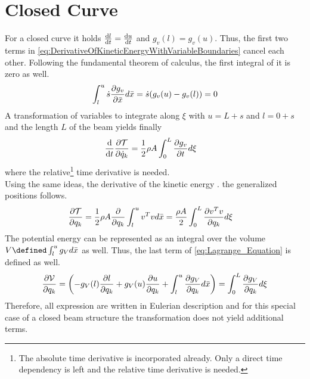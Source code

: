 \section{Closed Curve}
For a closed curve it holds $\frac{\mathrm{d} l}{\mathrm{d} t} = \frac{\mathrm{d} u}{\mathrm{d} t}$ and $g_v(l) = g_v(u)$.
Thus, the first two terms in \eqref{eq:DerivativeOfKineticEnergyWithVariableBoundaries} cancel each other.
Following the fundamental theorem of calculus, the first integral of it is zero as well.
%
\begin{align*}
  \int _l ^u \dot{s} \frac{\partial g_v}{\partial \bar{x}} d \bar{x} = \dot{s} (g_v(u) - g_v(l)) = 0
\end{align*}
%
A transformation of variables to integrate along $\xi$ with $u = L + s$ and $l = 0 + s$ and the length $L$ of the beam yields finally
%
\begin{align}
  \frac{\mathrm{d} }{\mathrm{d} t} \frac{\partial {\ensuremath{{\cal{T}}}}}{\partial {\dot{q}_k}} &= 
  \frac{1}{2} \rho A  \int _{0} ^{L}\frac{\partial {g_v}}{\partial {t}} d \xi
  \label{eq:KineticEnergyTerms}
\end{align}
%
where the relative\footnote{The absolute time derivative is incorporated already. Only a direct time dependency is left and the relative time derivative is needed.} time derivative is needed.\\
Using the same ideas, the derivative of the kinetic energy \wrt. the generalized positions follows.
%
\begin{align*}
  \frac{\partial {\ensuremath{{\cal{T}}}}}{\partial {q_k}} &= \frac{1}{2} \rho A \frac{\partial {}}{\partial {q_k}} \int _{l} ^{u} v^Tv d \bar{x} = 
    \frac{\rho A}{2} \int _{0} ^{L} \frac{\partial {v^Tv}}{\partial {q_k}} d \xi
\end{align*}
%
The potential energy can be represented as an integral over the volume $V \defined \int _{l} ^{u} g_V d\barx$ as well.
Thus, the last term of \eqref{eq:Lagrange_Equation} is defined as well.
%
\begin{align*}
  \frac{\partial {\ensuremath{{\cal{V}}}}}{\partial {q_k}} = \left(-g_V(l)  \frac{\partial {l}}{\partial {q_k}} +  g_V(u) \frac{\partial {u}}{\partial {q_k}} + \int _{l} ^{u} \frac{\partial {g_V}}{\partial {q_k}} d \bar{x} \right) = \int _{0} ^{L} \frac{\partial {g_V}}{\partial {q_k}} d \xi
\end{align*}
%
Therefore, all expression are written in Eulerian description and for this special case of a closed beam structure the transformation does not yield additional terms. 

